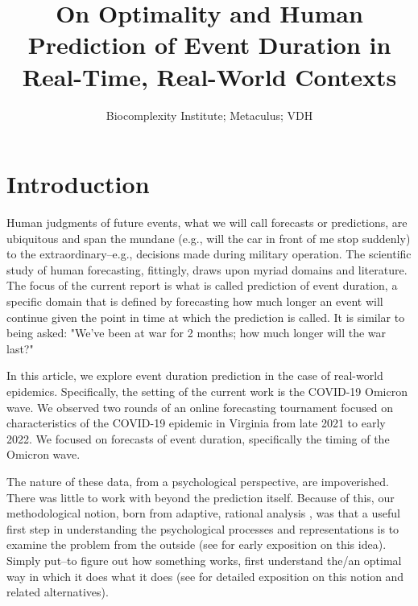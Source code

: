 \documentclass[a4paper,man,natbib]{apa6}
\title{On Optimality and Human Prediction of Event Duration in Real-Time, Real-World Contexts}
\author{Biocomplexity Institute; Metaculus; VDH}
\affiliation{TBA}
\begin{document}
\maketitle


\section{Introduction}\label{introduction}
Human judgments of future events, what we will call forecasts or predictions, are ubiquitous and span the mundane (e.g., will the car in front of me stop suddenly) to the extraordinary--e.g., decisions made during military operation. The scientific study of human forecasting, fittingly, draws upon myriad domains and literature. The focus of the current report is what is called prediction of event duration, a specific domain that is defined by forecasting how much longer an event will continue given the point in time at which the prediction is called.  It is similar to being asked: "We've been at war for 2 months; how much longer will the war last?"
 
In this article, we explore event duration prediction in the case of real-world epidemics.    Specifically, the setting of the current work is the COVID-19 Omicron wave. We observed two rounds of an online forecasting tournament focused on characteristics of the COVID-19 epidemic in Virginia from late 2021 to early 2022.  We focused on forecasts of event duration, specifically the timing of the Omicron wave.   

The nature of these data, from a psychological perspective, are impoverished.  There was little to work with beyond the prediction itself.  Because of this, our methodological notion, born from adaptive, rational analysis \citep{anderson2013adaptive, Lieder2020, marr2010vision}, was that a useful first step in understanding the psychological processes and representations is to examine the problem from the outside (see \cite{simon1969sciences} for early exposition on this idea).  Simply put--to figure out how something works, first understand the/an optimal way in which it does what it does (see \cite{Tauber2017} for detailed exposition on this notion and related alternatives).  
\end{document}
